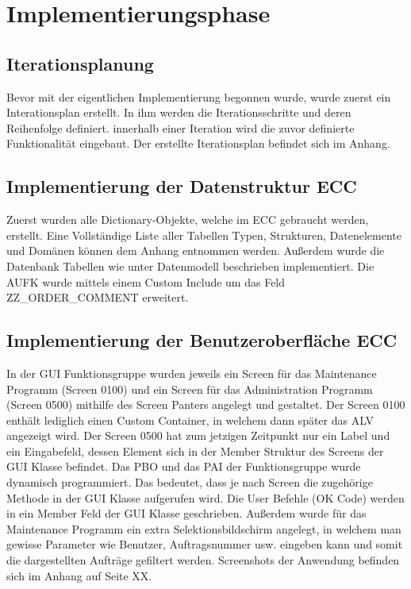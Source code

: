 \section{Implementierungsphase} 
\label{sec:Implementierungsphase}

\subsection{Iterationsplanung}
\label{sec:Iterationsplanung}
Bevor mit der eigentlichen Implementierung begonnen wurde, wurde zuerst ein Interationsplan erstellt. In ihm werden die Iterationsschritte und deren Reihenfolge definiert. innerhalb einer Iteration wird die zuvor definierte Funktionalität eingebaut. Der erstellte Iterationsplan befindet sich im Anhang.

\subsection{Implementierung der Datenstruktur ECC}
\label{sec:Implementierung der Datenstruktur ECC}
Zuerst wurden alle Dictionary-Objekte, welche im \ac{ECC} gebraucht werden, erstellt. Eine Vollständige Liste aller Tabellen Typen, Strukturen, Datenelemente und Domänen können dem Anhang entnommen werden. Außerdem wurde die Datenbank Tabellen wie unter Datenmodell beschrieben implementiert. Die AUFK wurde mittels einem Custom Include um das Feld ZZ\_ORDER\_COMMENT erweitert.

\subsection{Implementierung der Benutzeroberfläche ECC}
\label{sec:Implementierung der Benutzeroberfläche ECC}
In der GUI Funktionsgruppe wurden jeweils ein Screen für das Maintenance Programm (Screen 0100) und ein Screen für das Administration Programm (Screen 0500) mithilfe des Screen Panters angelegt und gestaltet. Der Screen 0100 enthält lediglich einen Custom Container, in welchem dann später das ALV angezeigt wird. Der Screen 0500 hat zum jetzigen Zeitpunkt nur ein Label und ein Eingabefeld, dessen Element sich in der Member Struktur des Screens der GUI Klasse befindet. Das \ac{PBO} und das \ac{PAI} der Funktionsgruppe wurde dynamisch programmiert. Das bedeutet, dass je nach Screen die zugehörige Methode in der GUI Klasse aufgerufen wird. Die User Befehle (OK Code) werden in ein Member Feld der GUI Klasse geschrieben. Außerdem wurde für das Maintenance Programm ein extra Selektionsbildschirm angelegt, in welchem man gewisse Parameter wie Benutzer, Auftragsnummer usw. eingeben kann und somit die dargestellten Aufträge gefiltert werden. Screenshots der Anwendung befinden sich im Anhang auf Seite XX.

